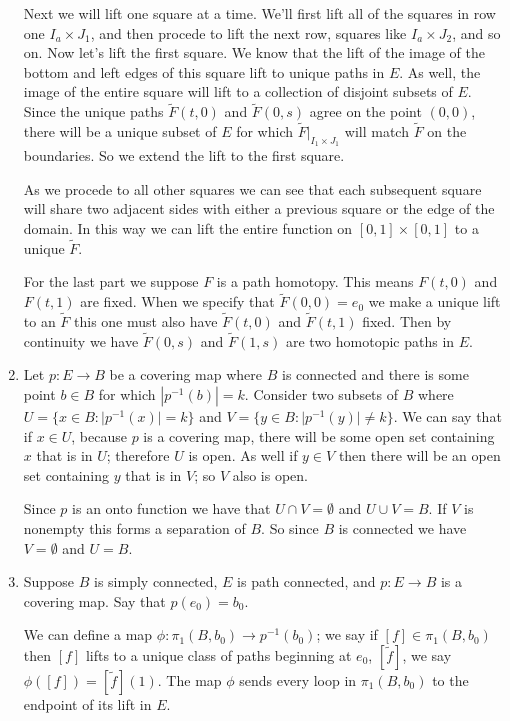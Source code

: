 \documentclass[12pt]{report}
\providecommand{\abs}[1]{\lvert#1\rvert} \providecommand{\norm}[1]{\lVert#1\rVert}
\begin{document}
\begin{enumerate}
Next we will lift one square at a time. We'll first lift all of the squares in
row one $I_a \times J_1$, and then procede to lift the next row, squares like
$I_a \times J_2$, and so on. Now let's lift the first square. We know that the
lift of the image of the bottom and left edges of this square lift to unique
paths in $E$. As well, the image of the entire square will lift to a collection
of disjoint subsets of $E$. Since the unique paths $\tilde{F}(t,0)$ and
$\tilde{F}(0,s)$ agree on the point $(0,0)$, there will be a unique subset of
$E$ for which  $\tilde{F}|_{I_1 \times J_1}$ will match $\tilde{F}$ on the
boundaries. So we extend the lift to the first square.

As we procede to all other squares we can see that each subsequent square will
share two adjacent sides with either a previous square or the edge of the
domain. In this way we can lift the entire function on $[0,1] \times [0,1]$ to a
unique $\tilde{F}$.

For the last part we suppose $F$ is a path homotopy. This means $F(t,0)$ and
$F(t,1)$ are fixed. When we specify that $\tilde{F}(0,0) = e_0$ we make a unique
lift to an $\tilde{F}$ this one must also have $\tilde{F}(t,0)$ and
$\tilde{F}(t,1)$ fixed. Then by continuity we have $\tilde{F}(0,s)$ and
$\tilde{F}(1,s)$ are two homotopic paths in $E$.


\item Let $p: E \to B$ be a covering map where $B$ is connected and there is
some point $b \in B$ for which $|p^{-1}(b)| = k$. Consider two subsets of $B$
where $U = \{x \in B : \abs{p^{-1}(x)} = k \}$ and $V = \{y\in B:\abs{p^{-1}(y)}
\neq k \}$. We can say that if $x \in U$, because $p$ is a covering map, there
will be some open set containing $x$ that is in $U$; therefore $U$ is open. As
well if $y \in V$ then there will be an open set containing $y$ that is in $V$;
so $V$ also is open.

Since $p$ is an onto function we have that $U \cap V = \emptyset$ and $U \cup V
= B$. If $V$ is nonempty this forms a separation of $B$. So since $B$ is
connected we have $V = \emptyset$ and $U = B$.

\item Suppose $B$ is simply connected, $E$ is path connected, and $p:E \to B$ is
a covering map. Say that $p(e_0) = b_0$.

We can define a map $\phi: \pi_1(B,b_0) \to p^{-1}(b_0)$; we say if $[f] \in
\pi_1(B,b_0)$ then $[f]$ lifts to a unique class of paths beginning at $e_0$,
$[\tilde{f}]$, we say $\phi([f]) = [\tilde{f}](1)$. The map $\phi$ sends every
loop in $\pi_1(B,b_0)$ to the endpoint of its lift in $E$.


\end{enumerate}
\end{document}
